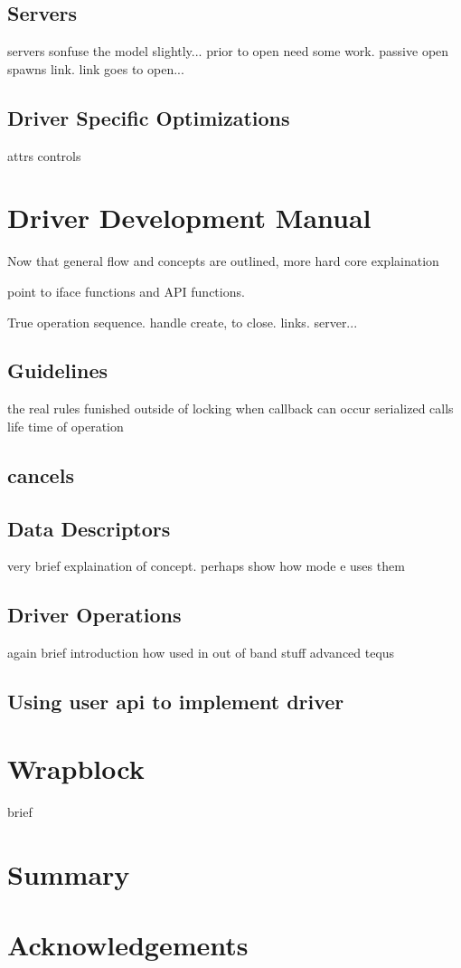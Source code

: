 \documentclass[11pt]{article}
\begin{document}
\subsection{Servers}
servers sonfuse the model slightly... prior to open need some work.  passive
open spawns link.  link goes to open...

\subsection{Driver Specific Optimizations}
attrs
controls

\section{Driver Development Manual}
Now that general flow and concepts are outlined, more hard core explaination

point to iface functions and API functions.

True operation sequence.  handle create, to close.  links.  server...

\subsection{Guidelines}
the real rules
funished outside of locking
when callback can occur
serialized calls
life time of operation

\subsection{cancels}

\subsection{Data Descriptors}
very brief explaination of concept.  perhaps show how mode e uses them

\subsection{Driver Operations}
again brief introduction
how used in out of band stuff
advanced tequs

\subsection{Using user api to implement driver}

\section{Wrapblock}
brief

\section{Summary}

\section*{Acknowledgements}
\end{document}
